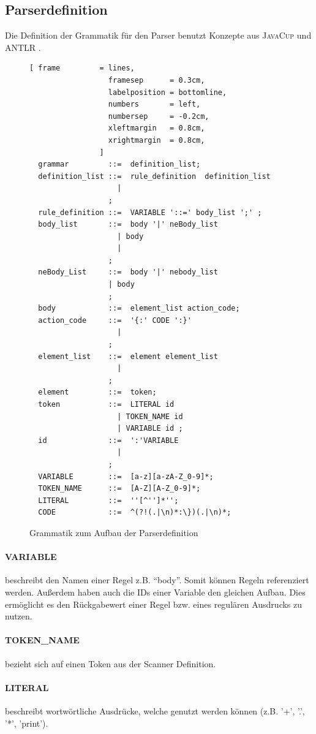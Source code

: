 \subsection{Parserdefinition}
Die Definition der Grammatik für den Parser benutzt Konzepte aus \textsc{JavaCup} und \textsc{ANTLR} .
\begin{figure}[!ht]
\begin{Verbatim}[ frame         = lines, 
                  framesep      = 0.3cm, 
                  labelposition = bottomline,
                  numbers       = left,
                  numbersep     = -0.2cm,
                  xleftmargin   = 0.8cm,
                  xrightmargin  = 0.8cm,
                ]
  grammar         ::=  definition_list;
  definition_list ::=  rule_definition  definition_list
	                | 
                  ;
  rule_definition ::=  VARIABLE '::=' body_list ';' ;
  body_list       ::=  body '|' neBody_list
	                | body
	                | 
                  ;
  neBody_List     ::=  body '|' nebody_list 
                  | body
                  ;
  body            ::=  element_list action_code;
  action_code     ::=  '{:' CODE ':}'
	                | 
                  ;
  element_list    ::=  element element_list
	                | 
                  ;
  element         ::=  token;
  token           ::=  LITERAL id
	                | TOKEN_NAME id
	                | VARIABLE id ;
  id              ::=  ':'VARIABLE
	                |
                  ;
  VARIABLE        ::=  [a-z][a-zA-Z_0-9]*;
  TOKEN_NAME      ::=  [A-Z][A-Z_0-9]*;
  LITERAL         ::=  ''[^'']*'';
  CODE            ::=  ^(?!(.|\n)*:\})(.|\n)*;
\end{Verbatim}
\caption{Grammatik zum Aufbau der Parserdefinition}
\label{fig:parser_grammar}
\end{figure}
\paragraph{VARIABLE} beschreibt den Namen einer Regel z.B. "`body"'. Somit können Regeln referenziert werden.  Außerdem haben auch die IDs einer Variable den gleichen Aufbau. Dies ermöglicht es den Rückgabewert einer Regel bzw. eines regulären Ausdrucks zu nutzen.
\paragraph{TOKEN\_NAME} bezieht sich auf einen Token aus der Scanner Definition.
\paragraph{LITERAL}  beschreibt wortwörtliche Ausdrücke, welche genutzt werden können (z.B. '+', '.', '*', 'print').
